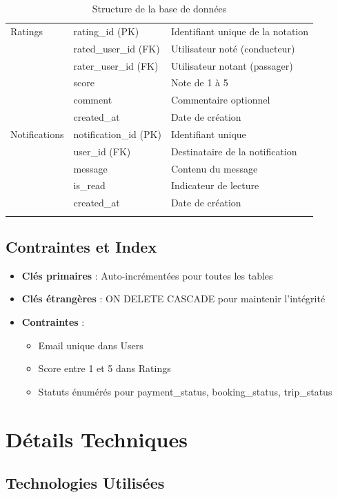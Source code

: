 \documentclass[12pt,a4paper]{report}
\begin{document}
\begin{longtable}{|l|l|p{6cm}|}
Ratings & rating\_id (PK) & Identifiant unique de la notation \\
 & rated\_user\_id (FK) & Utilisateur noté (conducteur) \\
 & rater\_user\_id (FK) & Utilisateur notant (passager) \\
 & score & Note de 1 à 5 \\
 & comment & Commentaire optionnel \\
 & created\_at & Date de création \\
\hline

Notifications & notification\_id (PK) & Identifiant unique \\
 & user\_id (FK) & Destinataire de la notification \\
 & message & Contenu du message \\
 & is\_read & Indicateur de lecture \\
 & created\_at & Date de création \\
\hline

\caption{Structure de la base de données}
\end{longtable}

\section{Contraintes et Index}

\begin{itemize}
    \item \textbf{Clés primaires} : Auto-incrémentées pour toutes les tables
    \item \textbf{Clés étrangères} : ON DELETE CASCADE pour maintenir l'intégrité
    \item \textbf{Contraintes} :
    \begin{itemize}
        \item Email unique dans Users
        \item Score entre 1 et 5 dans Ratings
        \item Statuts énumérés pour payment\_status, booking\_status, trip\_status
    \end{itemize}
\end{itemize}

\chapter{Détails Techniques}

\section{Technologies Utilisées}
\end{document}
